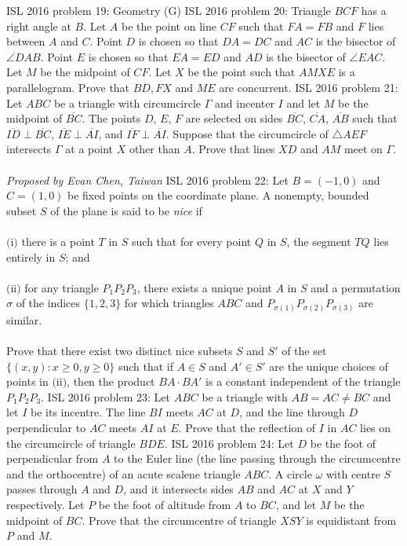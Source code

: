 ISL 2016 problem 19:  Geometry (G) 
ISL 2016 problem 20:  Triangle $BCF$ has a right angle at $B$. Let $A$ be the point on line $CF$ such that $FA=FB$ and $F$ lies between $A$ and $C$. Point $D$ is chosen so that $DA=DC$ and $AC$ is the bisector of $\angle{DAB}$. Point $E$ is chosen so that $EA=ED$ and $AD$ is the bisector of $\angle{EAC}$. Let $M$ be the midpoint of $CF$. Let $X$ be the point such that $AMXE$ is a parallelogram. Prove that $BD,FX$ and $ME$ are concurrent. 
ISL 2016 problem 21:  Let $ABC$ be a triangle with circumcircle $\Gamma$ and incenter $I$ and let $M$ be the midpoint of $\overline{BC}$. The points $D$, $E$, $F$ are selected on sides $\overline{BC}$, $\overline{CA}$, $\overline{AB}$ such that $\overline{ID} \perp \overline{BC}$, $\overline{IE}\perp \overline{AI}$, and $\overline{IF}\perp \overline{AI}$. Suppose that the circumcircle of $\triangle AEF$ intersects $\Gamma$ at a point $X$ other than $A$. Prove that lines $XD$ and $AM$ meet on $\Gamma$. \\\\
\textit{Proposed by Evan Chen, Taiwan} 
ISL 2016 problem 22:  Let $B = (-1, 0)$ and $C = (1, 0)$ be fixed points on the coordinate plane. A nonempty, bounded subset $S$ of the plane is said to be \textit{nice} if \\\\
$\text{(i)}$ there is a point $T$ in $S$ such that for every point $Q$ in $S$, the segment $TQ$ lies entirely in $S$; and \\\\
$\text{(ii)}$ for any triangle $P_1P_2P_3$, there exists a unique point $A$ in $S$ and a permutation $\sigma$ of the indices $\{1, 2, 3\}$ for which triangles $ABC$ and $P_{\sigma(1)}P_{\sigma(2)}P_{\sigma(3)}$ are similar. \\\\
Prove that there exist two distinct nice subsets $S$ and $S'$ of the set $\{(x, y) : x \geq 0, y \geq 0\}$ such that if $A \in S$ and $A' \in S'$ are the unique choices of points in $\text{(ii)}$, then the product $BA \cdot BA'$ is a constant independent of the triangle $P_1P_2P_3$. 
ISL 2016 problem 23:  Let $ABC$ be a triangle with $AB = AC \neq BC$ and let $I$ be its incentre. The line $BI$ meets $AC$ at $D$, and the line through $D$ perpendicular to $AC$ meets $AI$ at $E$. Prove that the reflection of $I$ in $AC$ lies on the circumcircle of triangle $BDE$. 
ISL 2016 problem 24:  Let $D$ be the foot of perpendicular from $A$ to the Euler line (the line passing through the circumcentre and the orthocentre) of an acute scalene triangle $ABC$. A circle $\omega$ with centre $S$ passes through $A$ and $D$, and it intersects sides $AB$ and $AC$ at $X$ and $Y$ respectively. Let $P$ be the foot of altitude from $A$ to $BC$, and let $M$ be the midpoint of $BC$. Prove that the circumcentre of triangle $XSY$ is equidistant from $P$ and $M$. 
